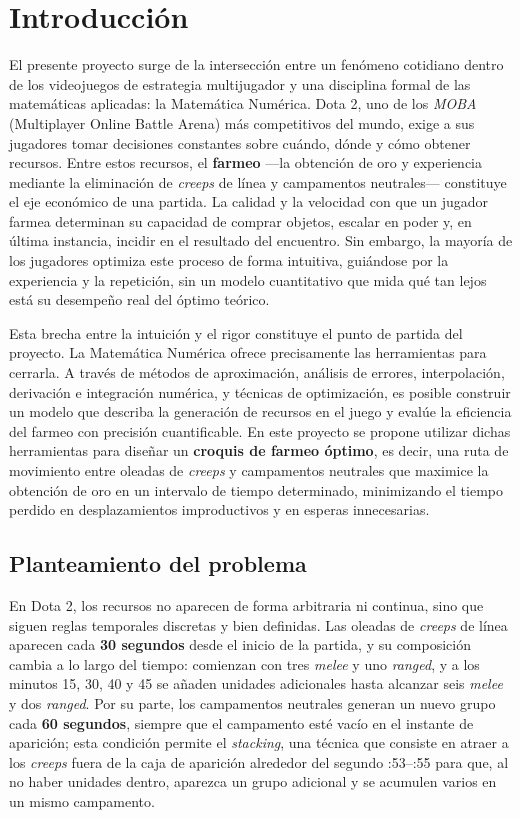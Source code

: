 \section{Introducción}

El presente proyecto surge de la intersección entre un fenómeno cotidiano dentro de los videojuegos de estrategia multijugador y una disciplina formal de las matemáticas aplicadas: la Matemática Numérica. Dota 2, uno de los \textit{MOBA} (Multiplayer Online Battle Arena) más competitivos del mundo, exige a sus jugadores tomar decisiones constantes sobre cuándo, dónde y cómo obtener recursos. Entre estos recursos, el \textbf{farmeo} ---la obtención de oro y experiencia mediante la eliminación de \textit{creeps} de línea y campamentos neutrales--- constituye el eje económico de una partida. La calidad y la velocidad con que un jugador farmea determinan su capacidad de comprar objetos, escalar en poder y, en última instancia, incidir en el resultado del encuentro. Sin embargo, la mayoría de los jugadores optimiza este proceso de forma intuitiva, guiándose por la experiencia y la repetición, sin un modelo cuantitativo que mida qué tan lejos está su desempeño real del óptimo teórico.

Esta brecha entre la intuición y el rigor constituye el punto de partida del proyecto. La Matemática Numérica ofrece precisamente las herramientas para cerrarla. A través de métodos de aproximación, análisis de errores, interpolación, derivación e integración numérica, y técnicas de optimización, es posible construir un modelo que describa la generación de recursos en el juego y evalúe la eficiencia del farmeo con precisión cuantificable. En este proyecto se propone utilizar dichas herramientas para diseñar un \textbf{croquis de farmeo óptimo}, es decir, una ruta de movimiento entre oleadas de \textit{creeps} y campamentos neutrales que maximice la obtención de oro en un intervalo de tiempo determinado, minimizando el tiempo perdido en desplazamientos improductivos y en esperas innecesarias.

\subsection{Planteamiento del problema}

En Dota 2, los recursos no aparecen de forma arbitraria ni continua, sino que siguen reglas temporales discretas y bien definidas. Las oleadas de \textit{creeps} de línea aparecen cada \textbf{30 segundos} desde el inicio de la partida, y su composición cambia a lo largo del tiempo: comienzan con tres \textit{melee} y uno \textit{ranged}, y a los minutos 15, 30, 40 y 45 se añaden unidades adicionales hasta alcanzar seis \textit{melee} y dos \textit{ranged}. Por su parte, los campamentos neutrales generan un nuevo grupo cada \textbf{60 segundos}, siempre que el campamento esté vacío en el instante de aparición; esta condición permite el \textit{stacking}, una técnica que consiste en atraer a los \textit{creeps} fuera de la caja de aparición alrededor del segundo :53--:55 para que, al no haber unidades dentro, aparezca un grupo adicional y se acumulen varios en un mismo campamento.

